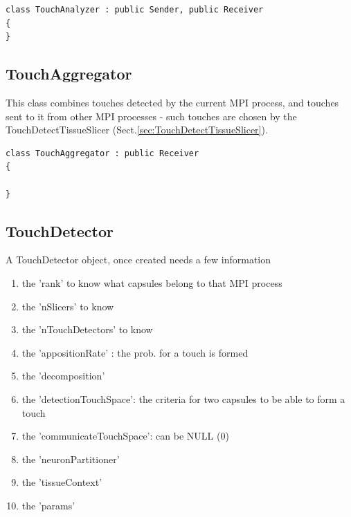 \begin{verbatim}
class TouchAnalyzer : public Sender, public Receiver
{
}
\end{verbatim}

\subsection{TouchAggregator}
\label{sec:TouchAggregator}

This class combines touches detected by the current MPI process, and touches
sent to it from other MPI processes - such touches are chosen by the
TouchDetectTissueSlicer (Sect.\ref{sec:TouchDetectTissueSlicer}).

\begin{verbatim}
class TouchAggregator : public Receiver
{

}
\end{verbatim}

\subsection{TouchDetector}
\label{sec:TouchDetector}

A TouchDetector object, once created needs a few information
\begin{enumerate}
  \item the 'rank' to know what capsules belong to that MPI process
  
  \item the 'nSlicers' to know
  
  \item the 'nTouchDetectors' to know
  
  \item the 'appositionRate' : the prob. for a touch is formed
  
  \item the 'decomposition' 
  
  \item the 'detectionTouchSpace': the  criteria for two capsules 
  to be able to form a touch
  
  \item the 'communicateTouchSpace': can be NULL (0)
  
  \item the 'neuronPartitioner' 
  
  \item the 'tissueContext'
  
  \item the 'params'
\end{enumerate}

